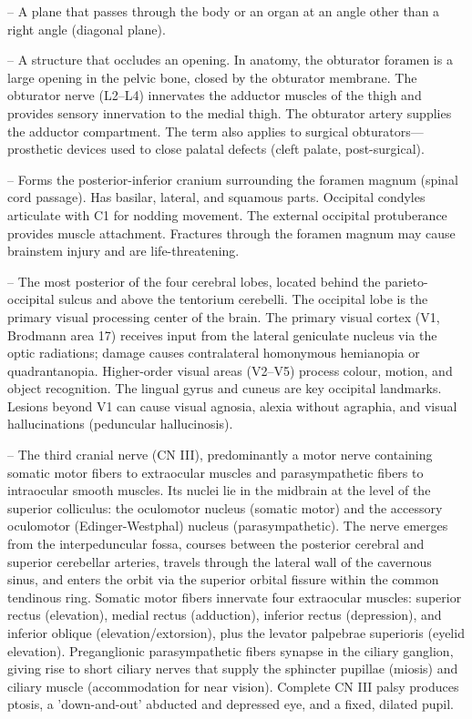 -- A plane that passes through the body or an organ at an angle other than a right angle (diagonal plane).

-- A structure that occludes an opening. In anatomy, the obturator foramen is a large opening in the pelvic bone, closed by the obturator membrane. The obturator nerve (L2--L4) innervates the adductor muscles of the thigh and provides sensory innervation to the medial thigh. The obturator artery supplies the adductor compartment. The term also applies to surgical obturators—prosthetic devices used to close palatal defects (cleft palate, post-surgical).

-- Forms the posterior-inferior cranium surrounding the foramen magnum (spinal cord passage). Has basilar, lateral, and squamous parts. Occipital condyles articulate with C1 for nodding movement. The external occipital protuberance provides muscle attachment. Fractures through the foramen magnum may cause brainstem injury and are life-threatening.

-- The most posterior of the four cerebral lobes, located behind the parieto-occipital sulcus and above the tentorium cerebelli. The occipital lobe is the primary visual processing center of the brain. The primary visual cortex (V1, Brodmann area 17) receives input from the lateral geniculate nucleus via the optic radiations; damage causes contralateral homonymous hemianopia or quadrantanopia. Higher-order visual areas (V2--V5) process colour, motion, and object recognition. The lingual gyrus and cuneus are key occipital landmarks. Lesions beyond V1 can cause visual agnosia, alexia without agraphia, and visual hallucinations (peduncular hallucinosis).

-- The third cranial nerve (CN III), predominantly a motor nerve containing somatic motor fibers to extraocular muscles and parasympathetic fibers to intraocular smooth muscles. Its nuclei lie in the midbrain at the level of the superior colliculus: the oculomotor nucleus (somatic motor) and the accessory oculomotor (Edinger-Westphal) nucleus (parasympathetic). The nerve emerges from the interpeduncular fossa, courses between the posterior cerebral and superior cerebellar arteries, travels through the lateral wall of the cavernous sinus, and enters the orbit via the superior orbital fissure within the common tendinous ring. Somatic motor fibers innervate four extraocular muscles: superior rectus (elevation), medial rectus (adduction), inferior rectus (depression), and inferior oblique (elevation/extorsion), plus the levator palpebrae superioris (eyelid elevation). Preganglionic parasympathetic fibers synapse in the ciliary ganglion, giving rise to short ciliary nerves that supply the sphincter pupillae (miosis) and ciliary muscle (accommodation for near vision). Complete CN III palsy produces ptosis, a 'down-and-out' abducted and depressed eye, and a fixed, dilated pupil.


